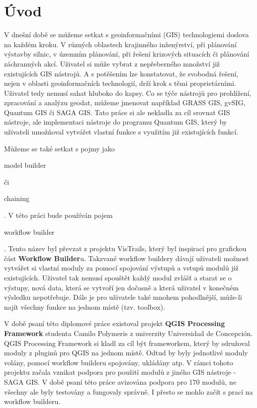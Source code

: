 \chapter*{Úvod}

V dnešní době se můžeme setkat s  geoinformačními (GIS) technologiemi doslova na každém kroku. V různých oblastech krajinného inženýrství, při plánování výstavby silnic, v územním plánování, při řešení krizových situacích či plánování záchranných akcí. Uživatel si může vybrat z nepřeberného množství již existujících GIS nástrojů. A s potěšením lze konstatovat, že svobodná řešení, nejen v oblasti geoinformačních technologií, drží krok s těmi proprietárními. Uživatel tedy nemusí sahat hluboko do kapsy. Co se týče nástrojů pro prohlížení, zpracování a analýzu  geodat, můžeme jmenovat například GRASS GIS, gvSIG, Quantum GIS či SAGA GIS. Tato práce si ale nekladla za cíl srovnat GIS nástroje, ale implementaci nástroje do programu Quantum GIS, který by uživateli umožňoval vytvářet vlastní funkce s využitím již existujících funkcí.

Můžeme se také setkat s pojmy jako \begin{scriptsize}model builder\end{scriptsize} či \begin{scriptsize}chaining\end{scriptsize}. V této práci bude používán pojem \begin{scriptsize} workflow builder \end{scriptsize}. Tento název byl převzat z projektu  VisTrails, který byl inspirací pro grafickou část \textbf{Workflow Builder}u. Takzvané workflow buildery dávají uživateli možnost vytvářet si vlastní moduly za pomocí spojování výstupů a vstupů modulů již existujících. Uživatel tak nemusí spouštět každý modul zvlášť a starat se o výstupy, nová data, která se vytvoří jen dočasně a která uživatel v konečném výsledku nepotřebuje. Dále je pro uživatele také mnohem pohodlnější, může-li najít všechny funkce na jednom místě (tzv. toolbox).%

V době psaní této diplomové práce existoval projekt  \textbf{QGIS Processing Framework} studenta Camilo Polymeris z univerzity Universidad de Concepción. QGIS Processing Framework si kladl za cíl být frameworkem, který by sdružoval moduly z pluginů pro QGIS na jednom místě. Odtud by byly jednotlivé moduly volány, pomocí workflow builderu spojovány, ukládány atp. V rámci tohoto projektu začala vznikat podpora pro použití modulů z jiného GIS nástroje -  SAGA GIS. V době psaní této práce avizována podpora pro 170 modulů, ne všechny ale byly testovány a fungovaly správně. I přesto se mohlo začít s prací na workflow builderu.

